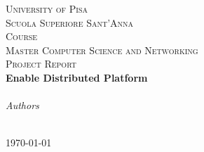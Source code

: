 \begin{titlepage}
  \begin{center}

    \textsc{\LARGE University of Pisa}\\[0.5cm]
    \textsc{\LARGE Scuola Superiore Sant'Anna}\\[2cm]

    \textsc{Course}\\[0.5cm]
    \textsc{\Large Master Computer Science and Networking}\\[2cm]

    \textsc{Project Report}
    \HRule\\[0.4cm]
    {\huge \bfseries Enable Distributed Platform\\[0.4cm]}
    \HRule\\[2cm]

    \emph{Authors}\\[0.1cm]
    \noindent{}\\[1cm]


    \vfill

    {\large \today}

  \end{center}
\end{titlepage}
